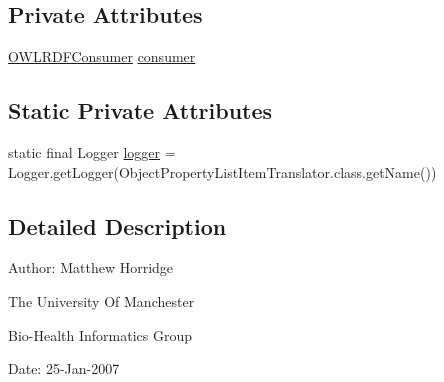 \subsection*{Private Attributes}
\begin{DoxyCompactItemize}
\item 
\hyperlink{classorg_1_1coode_1_1owlapi_1_1rdfxml_1_1parser_1_1_o_w_l_r_d_f_consumer}{O\-W\-L\-R\-D\-F\-Consumer} \hyperlink{classorg_1_1coode_1_1owlapi_1_1rdfxml_1_1parser_1_1_object_property_list_item_translator_ab47844593c9a744bfc455132597d866f}{consumer}
\end{DoxyCompactItemize}
\subsection*{Static Private Attributes}
\begin{DoxyCompactItemize}
\item 
static final Logger \hyperlink{classorg_1_1coode_1_1owlapi_1_1rdfxml_1_1parser_1_1_object_property_list_item_translator_a58753c7915b22ce635af64e3585b9f04}{logger} = Logger.\-get\-Logger(Object\-Property\-List\-Item\-Translator.\-class.\-get\-Name())
\end{DoxyCompactItemize}


\subsection{Detailed Description}
Author\-: Matthew Horridge\par
 The University Of Manchester\par
 Bio-\/\-Health Informatics Group\par
 Date\-: 25-\/\-Jan-\/2007\par
\par
 

